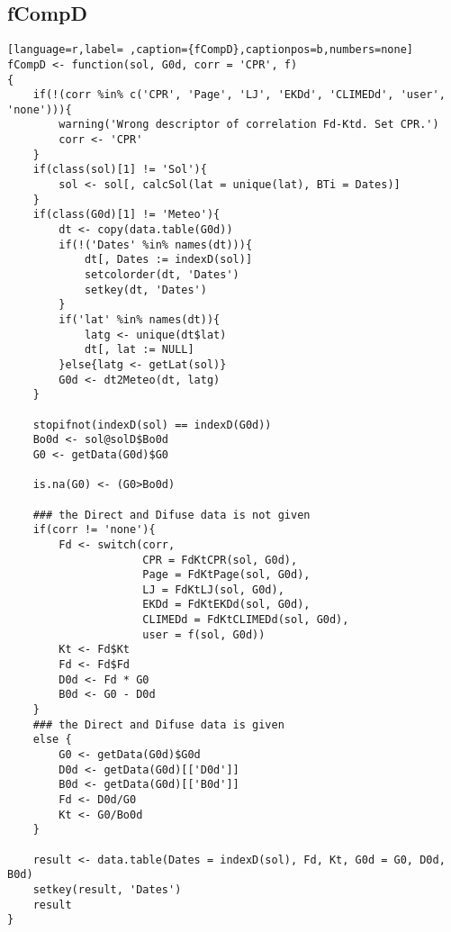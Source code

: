 \subsection{fCompD}
\label{sec:org34df164}
\label{subsec:fcompd}
\begin{lstlisting}[language=r,label= ,caption={fCompD},captionpos=b,numbers=none]
fCompD <- function(sol, G0d, corr = 'CPR', f)
{
    if(!(corr %in% c('CPR', 'Page', 'LJ', 'EKDd', 'CLIMEDd', 'user', 'none'))){
        warning('Wrong descriptor of correlation Fd-Ktd. Set CPR.')
        corr <- 'CPR'
    }
    if(class(sol)[1] != 'Sol'){
        sol <- sol[, calcSol(lat = unique(lat), BTi = Dates)]
    }
    if(class(G0d)[1] != 'Meteo'){
        dt <- copy(data.table(G0d))
        if(!('Dates' %in% names(dt))){
            dt[, Dates := indexD(sol)]
            setcolorder(dt, 'Dates')
            setkey(dt, 'Dates')
        }
        if('lat' %in% names(dt)){
            latg <- unique(dt$lat)
            dt[, lat := NULL]
        }else{latg <- getLat(sol)}
        G0d <- dt2Meteo(dt, latg)
    }  

    stopifnot(indexD(sol) == indexD(G0d))
    Bo0d <- sol@solD$Bo0d
    G0 <- getData(G0d)$G0

    is.na(G0) <- (G0>Bo0d)

    ### the Direct and Difuse data is not given
    if(corr != 'none'){
        Fd <- switch(corr,
                     CPR = FdKtCPR(sol, G0d),
                     Page = FdKtPage(sol, G0d),
                     LJ = FdKtLJ(sol, G0d),
                     EKDd = FdKtEKDd(sol, G0d),
                     CLIMEDd = FdKtCLIMEDd(sol, G0d),
                     user = f(sol, G0d))
        Kt <- Fd$Kt
        Fd <- Fd$Fd
        D0d <- Fd * G0
        B0d <- G0 - D0d
    }
    ### the Direct and Difuse data is given
    else {
        G0 <- getData(G0d)$G0d
        D0d <- getData(G0d)[['D0d']]
        B0d <- getData(G0d)[['B0d']]
        Fd <- D0d/G0
        Kt <- G0/Bo0d
    }

    result <- data.table(Dates = indexD(sol), Fd, Kt, G0d = G0, D0d, B0d)
    setkey(result, 'Dates')
    result
}
\end{lstlisting}
